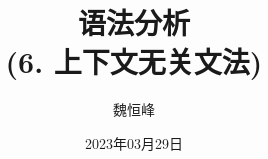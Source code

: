 \documentclass[handout]{beamer}
\title[语法分析]{语法分析 \\ (6. 上下文无关文法)}
\author[魏恒峰]{\large 魏恒峰}
\institute{hfwei@nju.edu.cn}
\date{2023年03月29日}
\begin{document}
\maketitle
% 




\thankyou{}

\end{document}
